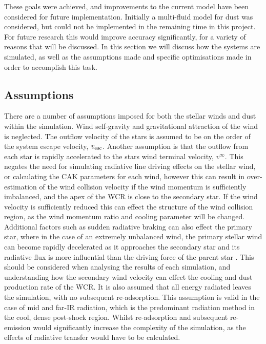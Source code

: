 \noindent
These goals were achieved, and improvements to the current model have been considered for future implementation.
Initially a multi-fluid model for dust was considered, but could not be implemented in the remaining time in this project.
For future research this would improve accuracy significantly, for a variety of reasons that will be discussed.
In this section we will discuss how the systems are simulated, as well as the assumptions made and specific optimisations made in order to accomplish this task.

\subsection{Assumptions}
\label{sec:simassumptions}

There are a number of assumptions imposed for both the stellar winds and dust within the simulation.
Wind self-gravity and gravitational attraction of the wind is neglected.
The outflow velocity of the stars is assumed to be on the order of the system escape velocity, $v_\text{esc}$.
Another assumption is that the outflow from each star is rapidly accelerated to the stars wind terminal velocity, $v^\infty$.
This negates the need for simulating radiative line driving effects on the stellar wind, or calculating the CAK parameters for each wind, however this can result in over-estimation of the wind collision velocity if the wind momentum is sufficiently imbalanced, and the apex of the WCR is close to the secondary star.
If the wind velocity is sufficiently reduced this can effect the structure of the wind collision region, as the wind momentum ratio and cooling parameter will be changed.
Additional factors such as sudden radiative braking can also effect the primary star, where in the case of an extremely unbalanced wind, the primary stellar wind can become rapidly decelerated as it approaches the secondary star and its radiative flux is more influential than the driving force of the parent star \parencite{gayley_sudden_1997}.
This should be considered when analysing the results of each simulation, and understanding how the secondary wind velocity can effect the cooling and dust production rate of the WCR.
It is also assumed that all energy radiated leaves the simulation, with no subsequent re-adsorption.
This assumption is valid in the case of mid and far-IR radiation, which is the predominant radiation method in the cool, dense post-shock region.
Whilst re-adsorption and subsequent re-emission would significantly increase the complexity of the simulation, as the effects of radiative transfer would have to be calculated.

